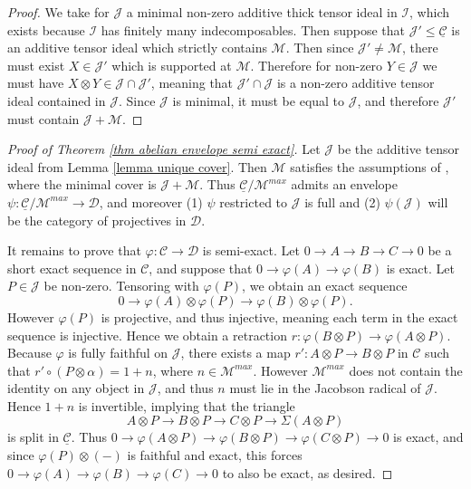 \documentclass[11pt]{amsart}
\def\JJ{\mathcal{J}}
\def\MM{\mathcal{M}}
\def\Cs{\mathcal{C}}
\def\II{\mathcal{I}}
\def\Cs{\mathscr{C}}
\def\Ds{\mathscr{D}}
\def\ul{\underline}
\theoremstyle{definition}
\theoremstyle{remark}
\numberwithin{equation}{section}
\begin{document}
\begin{proof}
    We take for $\JJ$ a minimal non-zero additive thick tensor ideal in $\II$, which exists because $\II$ has finitely many indecomposables.  Then suppose that $\JJ'\leq \ul{\Cs}$ is an additive tensor ideal which strictly contains $\MM$.  Then since $\JJ'\neq\MM$, there must exist $X\in\JJ'$ which is supported at $\MM$.  Therefore for non-zero $Y\in\JJ$ we must have $X\otimes Y\in\JJ\cap\JJ'$, meaning that $\JJ'\cap\JJ$ is a non-zero additive tensor ideal contained in $\JJ$. Since $\JJ$ is minimal, it must be equal to $\JJ$, and therefore $\JJ'$ must contain $\JJ+\MM$.
\end{proof}



\begin{proof}[Proof of Theorem \ref{thm abelian envelope semi exact}]
    Let $\JJ$ be the additive tensor ideal from Lemma \ref{lemma unique cover}.  Then $\MM$ satisfies the assumptions of \cite[Thm.~2.4.1 (2)]{CEO}, where the minimal cover is $\JJ+\MM$.  Thus $\ul{\Cs}/\MM^{max}$ admits an envelope $\psi:\ul{\Cs}/\MM^{max}\to\Ds$, and moreover (1) $\psi$ restricted to $\JJ$ is full and (2) $\psi(\JJ)$ will be the category of projectives in $\Ds$.

    It remains to prove that $\varphi:\Cs\to\Ds$ is semi-exact.  Let $0\to A\to B\to C\to 0$ be a short exact sequence in $\Cs$, and suppose that $0\to \varphi(A)\to\varphi(B)$ is exact.  Let $P\in\JJ$ be non-zero.  Tensoring with $\varphi(P)$, we obtain an exact sequence
    \[
    0\to \varphi(A)\otimes\varphi(P)\to\varphi(B)\otimes\varphi(P).
    \]
    However $\varphi(P)$ is projective, and thus injective, meaning each term in the exact sequence is injective.  Hence we obtain a retraction $r:\varphi(B\otimes P)\to\varphi(A\otimes P)$.  Because $\varphi$ is fully faithful on $\JJ$, there exists a map $r':A\otimes P\to B\otimes P$ in $\Cs$ such that $r'\circ (P\otimes \alpha)=1+n$, where $n\in\MM^{max}$.  However $\MM^{max}$ does not contain the identity on any object in $\JJ$, and thus $n$ must lie in the Jacobson radical of $\JJ$.  Hence $1+n$ is invertible, implying that the triangle
    \[
    A\otimes P\to B\otimes P\to C\otimes P\to\Sigma(A\otimes P)
    \]
    is split in $\ul{\Cs}$.  Thus $0\to \varphi(A\otimes P)\to\varphi(B\otimes P)\to\varphi(C\otimes P)\to 0$ is exact, and since $\varphi(P)\otimes(-)$ is faithful and exact, this forces $0\to\varphi(A)\to\varphi(B)\to\varphi(C)\to0$ to also be exact, as desired. 
\end{proof}
\end{document}

